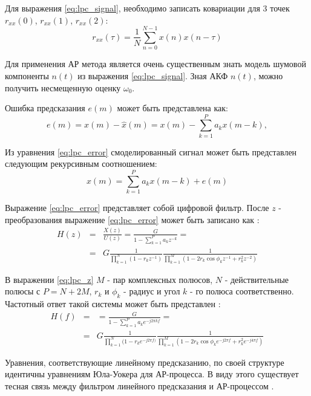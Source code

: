 Для выражения \ref{eq:lpc_signal}, необходимо записать ковариации для 3 точек
${r_{xx}(0)}$, ${r_{xx}(1)}$, ${r_{xx}(2)}$:
\begin{equation}
	\label{eq:lpc_cov}
	{r_{xx}(\tau) = \frac{1}{N} \sum \limits_{n=0}^{N-1} x(n) x(n-\tau)}
\end{equation}

Для применения АР метода является очень существенным знать модель шумовой компоненты ${n(t)}$ из выражения
\ref{eq:lpc_signal}. Зная АКФ ${n(t)}$, можно получить несмещенную оценку ${\omega_0}$.

Ошибка предсказания ${e(m)}$ может быть представлена как:
\begin{equation}
	\label{eq:lpc_error}
	e(m) = x(m) - \hat{x}(m) = x(m) - \sum \limits_{k=1}^P a_k x(m-k),
\end{equation}

Из уравнения \ref{eq:lpc_error} смоделированный сигнал может быть представлен следующим рекурсивным соотношением:
\begin{equation}
	\label{eq:lpc_signal}
	x(m) = \sum \limits_{k=1}^P a_k x(m-k) + e(m)
\end{equation}

Выражение \ref{eq:lpc_error} представляет собой цифровой фильтр.
После ${z}$ - преобразования выражение \ref{eq:lpc_error} может быть записано как \cite{saeed_book}:
\begin{eqnarray}
	\label{eq:lpc_z}
		H(z)	& = & \frac{X(z)}{U(z)} = \frac{G}{1 - \sum \limits_{k=1}^P a_kz^{-k}} =  \nonumber \\
			& = & G\frac{1}{\prod \limits_{k=1}^N (1-r_kz^{-1})} \frac{1}{\prod \limits_{k=1}^M (1-2r_k \cos \phi_k z^{-1} + r_k^2z^{-2})}
\end{eqnarray}

В выражении \ref{eq:lpc_z} ${M}$ - пар комплексных полюсов, ${N}$ - действительные полюсы с ${P=N+2M}$,
${r_k}$ и ${\phi_k}$ - радиус и угол ${k}$ - го полюса соответственно. Частотный ответ такой системы 
может быть представлен \cite{saeed_book}:
\begin{eqnarray}
	\label{eq:lpc_freq_resp}
		H(f)	& = & = \frac{G}{1 - \sum \limits_{k=1}^P a_k e^{-j2 \pi kf}} =  \nonumber \\
			& = & G\frac{1}{\prod \limits_{k=1}^N (1-r_k e^{-j2 \pi f)}} \frac{1}{\prod \limits_{k=1}^M (1-2r_k \cos \phi_k e^{-j2 \pi f} + r_k^2 e^{-j4 \pi f})}
\end{eqnarray}

Уравнения, соответствующие линейному предсказанию, по своей структуре идентичны уравнениям Юла-Уокера для АР-процесса.
В виду этого существует тесная связь между фильтром линейного предсказания и АР-процессом \cite{marpl_book}.

